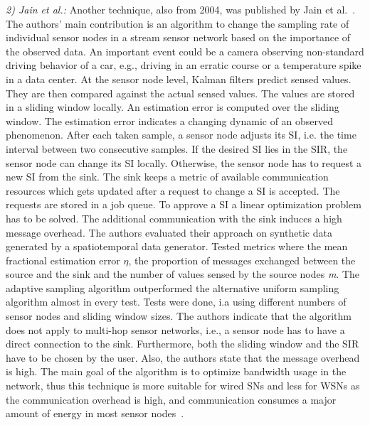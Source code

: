 \textit{2) Jain et al.:}
Another technique, also from 2004, was published by Jain et
al.~\cite{jain2004adaptive}. The authors' main contribution is an algorithm to
change the sampling rate of individual sensor nodes in a stream sensor network
based on the importance of the observed data. An important event could be a
camera observing non-standard driving behavior of a car, e.g., driving in an
erratic course or a temperature spike in a data center. At the sensor node
level, Kalman filters predict sensed values. They are then compared against the
actual sensed values. The values are stored in a sliding window locally. An
estimation error is computed over the sliding window. The estimation error
indicates a changing dynamic of an observed phenomenon. After each taken
sample, a sensor node adjusts its \ac{SI}, i.e. the time interval between two
consecutive samples. If the desired \ac{SI} lies in the \ac{SIR}, the sensor
node can change its \ac{SI} locally. Otherwise, the sensor node has to request
a new \ac{SI} from the sink. The sink keeps a metric of available communication
resources which gets updated after a request to change a \ac{SI} is accepted.
The requests are stored in a job queue. To approve a \ac{SI} a linear
optimization problem has to be solved. The additional communication with the
sink induces a high message overhead. The authors evaluated their approach on
synthetic data generated by a spatiotemporal data generator. Tested metrics
where the mean fractional estimation error $ \eta $, the proportion of messages
exchanged between the source and the sink and the number of values sensed by
the source nodes \textit{m}. The adaptive sampling algorithm outperformed the
alternative uniform sampling algorithm almost in every test. Tests were done,
i.a using different numbers of sensor nodes and sliding window sizes. The
authors indicate that the algorithm does not apply to multi-hop sensor
networks, i.e., a sensor node has to have a direct connection to the sink.
Furthermore, both the sliding window and the \ac{SIR} have to be chosen by the
user. Also, the authors state that the message overhead is high. The main goal
of the algorithm is to optimize bandwidth usage in the network, thus this
technique is more suitable for wired \acp{SN} and less for \acp{WSN} as the
communication overhead is high, and communication consumes a major amount of
energy in most sensor nodes~\cite{raghunathan2002energy}.

\par

